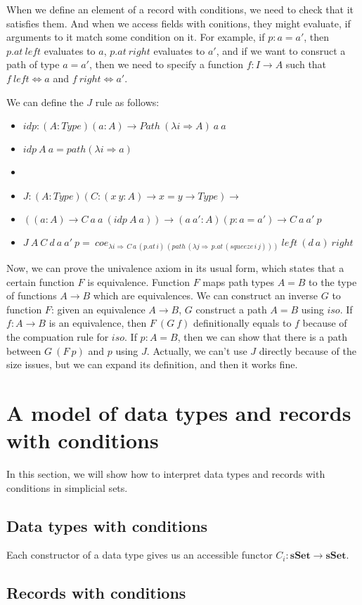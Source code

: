 \documentclass{amsart}
\theoremstyle{definition}
\theoremstyle{remark}
\newcommand{\cat}[1]{\mathbf{#1}}
\newcommand{\sSet}{\cat{sSet}}
\newcommand{\red}{\Rightarrow}
\newcommand{\deq}{\Leftrightarrow}
\numberwithin{figure}{section}
\begin{document}
When we define an element of a record with conditions, we need to check that it satisfies them.
And when we access fields with conitions, they might evaluate, if arguments to it match some condition on it.
For example, if $p : a = a'$, then $p.at\ left$ evaluates to $a$, $p.at\ right$ evaluates to $a'$,
and if we want to consruct a path of type $a = a'$, then we need to specify a function $f : I \to A$ such that $f\ left \deq a$ and $f\ right \deq a'$.

We can define the $J$ rule as follows:
\begin{itemize}
\item[] $idp : (A : Type) (a : A) \to Path\ (\lambda i \red A)\ a\ a$
\item[] $idp\ A\ a = path (\lambda i \red a)$
\item[]
\item[] $J : (A : Type) (C : (x\ y : A) \to x = y \to Type) \to$
\item[] \qquad $((a : A) \to C\ a\ a\ (idp\ A\ a)) \to (a\ a' : A) (p : a = a') \to C\ a\ a'\ p$
\item[] $J\ A\ C\ d\ a\ a'\ p =\ coe_{\lambda i \red \,C\,a\,(p.at\,i)\,(path\,(\lambda j \red \,p.at\,(squeeze\,i\,j)))}\ left\ (d\ a)\ right$
\end{itemize}

Now, we can prove the univalence axiom in its usual form, which states that a certain function $F$ is equivalence.
Function $F$ maps path types $A = B$ to the type of functions $A \to B$ which are equivalences.
We can construct an inverse $G$ to function $F$: given an equivalence $A \to B$, $G$ construct a path $A = B$ using $iso$.
If $f : A \to B$ is an equivalence, then $F\ (G\ f)$ definitionally equals to $f$ because of the compuation rule for $iso$.
If $p : A = B$, then we can show that there is a path between $G\ (F\ p)$ and $p$ using $J$.
Actually, we can't use $J$ directly because of the size issues, but we can expand its definition, and then it works fine.

\section{A model of data types and records with conditions}

In this section, we will show how to interpret data types and records with conditions in simplicial sets.

\subsection{Data types with conditions}

Each constructor of a data type gives us an accessible functor $C_i : \sSet \to \sSet$.


\subsection{Records with conditions}



\end{document}
